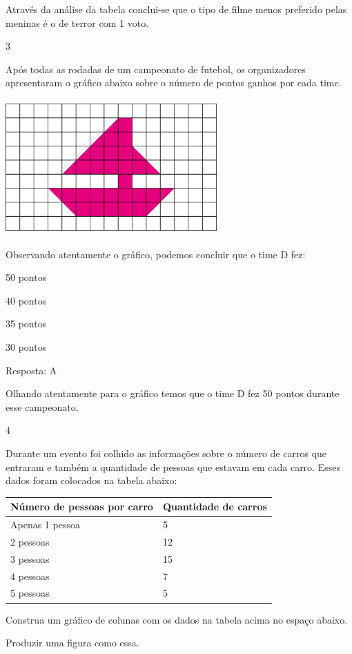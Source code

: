 \begin{escolha}
Através da análise da tabela conclui-se que o tipo de filme menos
preferido pelas meninas é o de terror com 1 voto.

\num{3}

Após todas as rodadas de um campeonato de futebol, os organizadores
apresentaram o gráfico abaixo sobre o número de pontos ganhos por cada
time.

\includegraphics[width=3.19194in,height=2.04184in]{media/image94.png}

Observando atentamente o gráfico, podemos concluir que o time D fez:

\begin{escolha}
\item
  50 pontos
\item
  40 pontos
\item
  35 pontos
\item
  30 pontos
\end{escolha}

Resposta: A

Olhando atentamente para o gráfico temos que o time D fez 50 pontos
durante esse campeonato.

\num{4}

Durante um evento foi colhido as informações sobre o número de carros
que entraram e também a quantidade de pessoas que estavam em cada carro.
Esses dados foram colocados na tabela abaixo:

\begin{longtable}[]{@{}ll@{}}
\toprule
Número de pessoas por carro & Quantidade de carros\tabularnewline
\midrule
\endhead
Apenas 1 pessoa & 5\tabularnewline
2 pessoas & 12\tabularnewline
3 pessoas & 15\tabularnewline
4 pessoas & 7\tabularnewline
5 pessoas & 5\tabularnewline
\bottomrule
\end{longtable}

Construa um gráfico de colunas com os dados na tabela acima no espaço
abaixo.

Produzir uma figura como essa.


\end{escolha}
